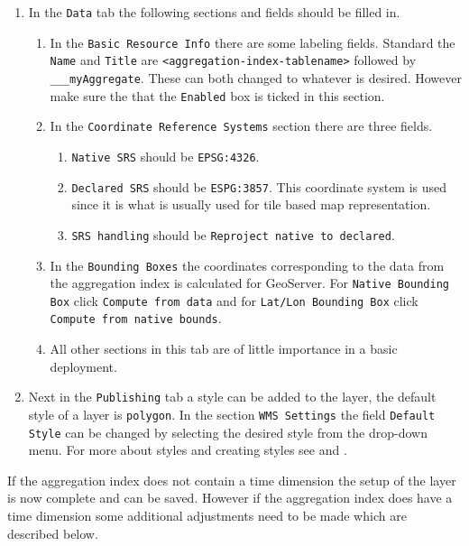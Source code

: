 \begin{enumerate}[resume]
	\item In the \lstinline|Data| tab the following sections and fields should be filled in.
	\begin{enumerate}
		\item In the \lstinline|Basic Resource Info| there are some labeling fields. Standard the \lstinline|Name| and \lstinline|Title| are \lstinline|<aggregation-index-tablename>| followed by \lstinline|___myAggregate|. These can both changed to whatever is desired. However make sure the that the \lstinline|Enabled| box is ticked in this section.
		\item In the \lstinline|Coordinate Reference Systems| section there are three fields.
			\begin{enumerate}
				\item \lstinline|Native SRS| should be \lstinline|EPSG:4326|.
				\item \lstinline|Declared SRS| should be \lstinline|ESPG:3857|. This coordinate system is used since it is what is usually used for tile based map representation.
				\item \lstinline|SRS handling| should be \lstinline|Reproject native to declared|.
			\end{enumerate}
		\item In the \lstinline|Bounding Boxes| the coordinates corresponding to the data from the aggregation index is calculated for GeoServer. For \lstinline|Native Bounding Box| click \lstinline|Compute from data| and for \lstinline|Lat/Lon Bounding Box| click \lstinline|Compute from native bounds|.
		\item All other sections in this tab are of little importance in a basic deployment.
	\end{enumerate}
	\item Next in the \lstinline|Publishing| tab a style can be added to the layer, the default style of a layer is \lstinline|polygon|. In the section \lstinline|WMS Settings| the field \lstinline|Default| \lstinline|Style| can be changed by selecting the desired style from the drop-down menu. For more about styles and creating styles see  and .
\end{enumerate}

\noindent If the aggregation index does not contain a time dimension the setup of the layer is now complete and can be saved. However if the aggregation index does have a time dimension some additional adjustments need to be made which are described below.

